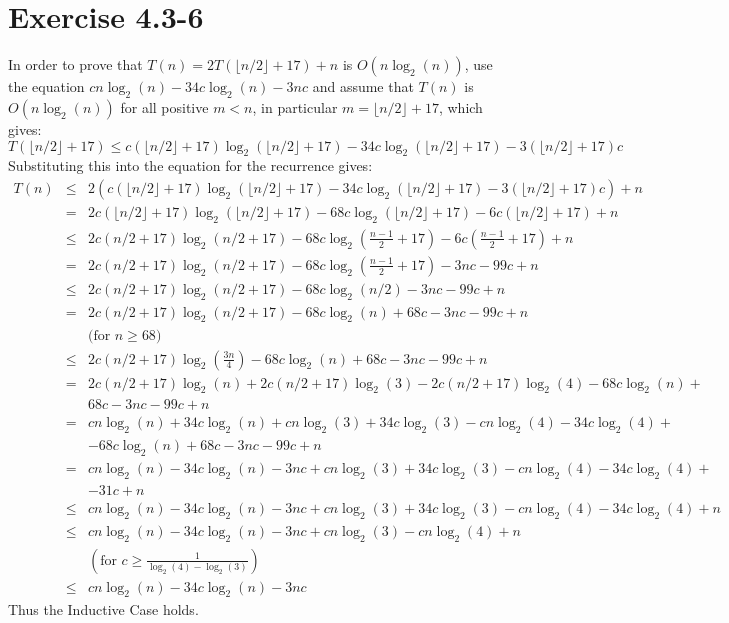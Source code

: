 \documentclass{article}
\begin{document}
\section*{Exercise 4.3-6}

In order to prove that $T(n) = 2T(\lfloor n / 2 \rfloor + 17) + n$ is $O(n \log_2(n))$, use the equation $cn\log_2(n) - 34c\log_2(n) - 3nc$ and assume that $T(n)$ is $O(n\log_2(n))$ for all positive $m < n$, in particular $m = \lfloor n / 2 \rfloor + 17$, which gives:
\begin{equation*}
	T(\lfloor n / 2 \rfloor + 17) \leq c (\lfloor n / 2 \rfloor + 17)\log_2(\lfloor n / 2 \rfloor + 17) - 34c\log_2(\lfloor n /2 \rfloor + 17) - 3(\lfloor n / 2 \rfloor + 17)c
\end{equation*}
Substituting this into the equation for the recurrence gives:
\begin{eqnarray*}
	T(n) &\leq& 2(c(\lfloor n / 2 \rfloor + 17)\log_2(\lfloor n / 2 \rfloor + 17) - 34c\log_2(\lfloor n / 2 \rfloor + 17) - 3(\lfloor n / 2 \rfloor + 17)c) + n \\
	 &=& 2c(\lfloor n / 2 \rfloor + 17)\log_2(\lfloor n / 2 \rfloor + 17) - 68c\log_2(\lfloor n / 2 \rfloor + 17) - 6c(\lfloor n / 2 \rfloor + 17) + n \\
	 &\leq& 2c(n / 2 + 17)\log_2(n / 2 + 17) - 68c\log_2\left(\frac{n - 1}{2} + 17\right) - 6c\left(\frac{n - 1}{2} + 17\right) + n \\
	 &=& 2c(n / 2 + 17)\log_2(n / 2 + 17) - 68c\log_2\left(\frac{n - 1}{2} + 17\right) - 3nc - 99c + n \\
	 &\leq& 2c(n / 2 + 17)\log_2(n / 2 + 17) - 68c\log_2(n/2) - 3nc - 99c + n \\
	 &=& 2c(n / 2 + 17)\log_2(n / 2 + 17) - 68c\log_2(n) + 68c - 3nc -99c + n \\
	 &&\text{(for $n \geq 68$)} \\
	 &\leq& 2c(n / 2 + 17)\log_2\left(\frac{3n}{4}\right) - 68c\log_2(n) + 68c - 3nc - 99c + n \\
	 &=& 2c(n / 2 + 17)\log_2(n) + 2c(n / 2 + 17)\log_2(3) - 2c(n / 2 + 17)\log_2(4) - 68c\log_2(n) + \\
	 && 68c - 3nc - 99c + n \\
	 &=& cn\log_2(n) + 34c\log_2(n) + cn\log_2(3) + 34c\log_2(3) - cn\log_2(4) - 34c\log_2(4) + \\
	 && - 68c\log_2(n) + 68c - 3nc - 99c + n \\
	 &=& cn\log_2(n) - 34c\log_2(n) - 3nc + cn\log_2(3) + 34c\log_2(3) - cn\log_2(4) - 34c\log_2(4) + \\
	 && - 31c + n \\
	 &\leq& cn\log_2(n) - 34c\log_2(n) - 3nc + cn\log_2(3) + 34c\log_2(3) - cn\log_2(4) - 34c\log_2(4) + n \\
	 &\leq& cn\log_2(n) - 34c\log_2(n) - 3nc + cn\log_2(3) - cn\log_2(4) + n \\
	 &&\left(\text{for } c \geq \frac{1}{\log_2(4) - \log_2(3)}\right) \\
	 &\leq& cn\log_2(n) - 34c\log_2(n) - 3nc
\end{eqnarray*}
Thus the Inductive Case holds.
\end{document}
